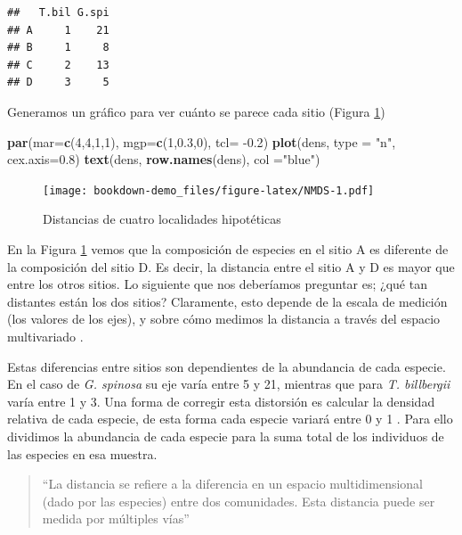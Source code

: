 \documentclass[]{book}
\newenvironment{Shaded}{\begin{snugshade}}{\end{snugshade}}
\newcommand{\KeywordTok}[1]{\textcolor[rgb]{0.13,0.29,0.53}{\textbf{{#1}}}}
\newcommand{\DataTypeTok}[1]{\textcolor[rgb]{0.13,0.29,0.53}{{#1}}}
\newcommand{\DecValTok}[1]{\textcolor[rgb]{0.00,0.00,0.81}{{#1}}}
\newcommand{\FloatTok}[1]{\textcolor[rgb]{0.00,0.00,0.81}{{#1}}}
\newcommand{\StringTok}[1]{\textcolor[rgb]{0.31,0.60,0.02}{{#1}}}
\newcommand{\NormalTok}[1]{{#1}}
\begin{document}
\begin{verbatim}
##   T.bil G.spi
## A     1    21
## B     1     8
## C     2    13
## D     3     5
\end{verbatim}

Generamos un gráfico para ver cuánto se parece cada sitio (Figura
\ref{fig:NMDS})

\begin{Shaded}
\begin{Highlighting}[]
\KeywordTok{par}\NormalTok{(}\DataTypeTok{mar=}\KeywordTok{c}\NormalTok{(}\DecValTok{4}\NormalTok{,}\DecValTok{4}\NormalTok{,}\DecValTok{1}\NormalTok{,}\DecValTok{1}\NormalTok{), }\DataTypeTok{mgp=}\KeywordTok{c}\NormalTok{(}\DecValTok{1}\NormalTok{,}\FloatTok{0.3}\NormalTok{,}\DecValTok{0}\NormalTok{), }\DataTypeTok{tcl=} \NormalTok{-}\FloatTok{0.2}\NormalTok{)}
\KeywordTok{plot}\NormalTok{(dens, }\DataTypeTok{type =} \StringTok{"n"}\NormalTok{, }\DataTypeTok{cex.axis=}\FloatTok{0.8}\NormalTok{) }
\KeywordTok{text}\NormalTok{(dens, }\KeywordTok{row.names}\NormalTok{(dens), }\DataTypeTok{col =}\StringTok{"blue"}\NormalTok{)}
\end{Highlighting}
\end{Shaded}

\begin{figure}[htbp]
\centering
\texttt{[image: bookdown-demo\_files/figure-latex/NMDS-1.pdf]}
\caption{\label{fig:NMDS}Distancias de cuatro localidades hipotéticas}
\end{figure}

En la Figura \ref{fig:NMDS} vemos que la composición de especies en el
sitio A es diferente de la composición del sitio D. Es decir, la
distancia entre el sitio A y D es mayor que entre los otros sitios. Lo
siguiente que nos deberíamos preguntar es; ¿qué tan distantes están los
dos sitios? Claramente, esto depende de la escala de medición (los
valores de los ejes), y sobre cómo medimos la distancia a través del
espacio multivariado \citep{Stevens2009}.

Estas diferencias entre sitios son dependientes de la abundancia de cada
especie. En el caso de \emph{G. spinosa} su eje varía entre 5 y 21,
mientras que para \emph{T. billbergii} varía entre 1 y 3. Una forma de
corregir esta distorsión es calcular la densidad relativa de cada
especie, de esta forma cada especie variará entre 0 y 1
\citep{Stevens2009}. Para ello dividimos la abundancia de cada especie
para la suma total de los individuos de las especies en esa muestra.

\begin{quote}
``La distancia se refiere a la diferencia en un espacio multidimensional
(dado por las especies) entre dos comunidades. Esta distancia puede ser
medida por múltiples vías''
\end{quote}
\end{document}
